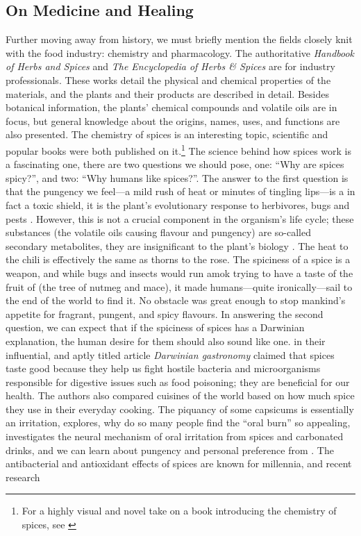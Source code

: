 \subsection{On Medicine and Healing}

Further moving away from history, we must briefly mention the fields closely knit with the food industry: chemistry and pharmacology. The authoritative \textit{Handbook of Herbs and Spices} \autocite{peter_handbook_2012} and \textit{The Encyclopedia of Herbs \& Spices} \autocite{ravindran_encyclopedia_2017} are for industry professionals. These works detail the physical and chemical properties of the materials, and the plants and their products are described in detail. Besides botanical information, the plants' chemical compounds and volatile oils are in focus, but general knowledge about the origins, names, uses, and functions are also presented. The chemistry of spices is an interesting topic, scientific and popular books were both published on it.\footnote{For a highly visual and novel take on a book introducing the chemistry of spices, see \textcite{farrimond_science_2018}} The science behind how spices work is a fascinating one, there are two questions we should pose, one: ``Why are spices spicy?'', and two: ``Why humans like spices?''. The answer to the first question is that the pungency we feel---a mild rush of heat or minutes of tingling lips---is a in fact a toxic shield, it is the plant's evolutionary response to herbivores, bugs and pests \autocite[21]{turner_spice_2004}. However, this is not a crucial component in the organism's life cycle; these substances (the volatile oils causing flavour and pungency) are so-called secondary metabolites, they are insignificant to the plant's biology \autocite[18]{parthasarathy_chemistry_2008}. The heat to the chili is effectively the same as thorns to the rose. The spiciness of a spice is a weapon, and while bugs and insects would run amok trying to have a taste of the fruit of  (the tree of nutmeg and mace), it made humans---quite ironically---sail to the end of the world to find it. No obstacle was great enough to stop mankind's appetite for fragrant, pungent, and spicy flavours. In answering the second question, we can expect that if the spiciness of spices has a Darwinian explanation, the human desire for them should also sound like one. \textcite{sherman_darwinian_1999} in their influential, and aptly titled article \textit{Darwinian gastronomy} claimed that spices taste good because they help us fight hostile bacteria and microorganisms responsible for digestive issues such as food poisoning; they are beneficial for our health. The authors also compared cuisines of the world based on how much spice they use in their everyday cooking. The piquancy of some capsicums is essentially an irritation, \textcite{spence_why_2018} explores, why do so many people find the ``oral burn'' so appealing, \textcite{carstens_it_2002} investigates the neural mechanism of oral irritation from spices and carbonated drinks, and we can learn about pungency and personal preference from \textcite{prescott_pungency_1995}. The antibacterial and antioxidant effects of spices are known for millennia, and recent research 